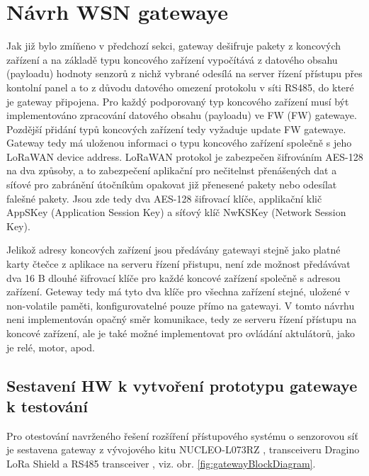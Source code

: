     

\section{Návrh WSN gatewaye}
Jak již bylo zmíňeno v předchozí sekci, gateway dešifruje pakety z koncových zařízení a na základě typu koncového zařízení vypočítává z datového obsahu (payloadu) hodnoty senzorů z nichž vybrané odesílá na server řízení přístupu přes kontolní panel a to z důvodu datového omezení protokolu v síti RS485, do které je gateway připojena.
Pro každý podporovaný typ koncového zařízení musí být implementováno zpracování datového obsahu (payloadu) ve FW (FW) gatewaye. Pozdější přidání typů koncových zařízení tedy vyžaduje update FW gatewaye.
Gateway tedy má uloženou informaci o typu koncového zařízení společně s jeho LoRaWAN device address.
LoRaWAN protokol je zabezpečen šifrováním AES-128 na dva způsoby, a to zabezpečení aplikační pro nečitelnst přenášených dat a síťové pro zabránění útočníkům opakovat již přenesené pakety nebo odesílat falešné pakety. Jsou zde tedy dva AES-128 šifrovací klíče, applikační klič AppSKey (Application Session Key) a síťový klíč NwKSKey (Network Session Key).

Jelikož adresy koncových zařízení jsou předávány gatewayi stejně jako platné karty čtečce z aplikace na serveru řízení přistupu, není zde možnost předávávat dva 16 B dlouhé šifrovací klíče pro každé koncové zařízení společně s adresou zařízení. Geteway tedy má tyto dva klíče pro všechna zařízení stejné, uložené v non-volatile paměti, konfigurovatelné pouze přímo na gatewayi.
V tomto návrhu neni implementován opačný směr komunikace, tedy ze serveru řízení přístupu na koncové zařízení, ale je také možné implementovat pro ovládání aktulátorů, jako je relé, motor, apod.



\subsection{Sestavení HW k vytvoření prototypu gatewaye k testování}
Pro otestování navrženého řešení rozšíření přístupového systému o senzorovou síť je sestavena gateway z vývojového kitu NUCLEO-L073RZ \cite{nucleoST}, transceiveru Dragino LoRa Shield \cite{RFM95w} a RS485 transceiver \cite{rs485tr}, viz. obr. \ref{fig:gatewayBlockDiagram}.

